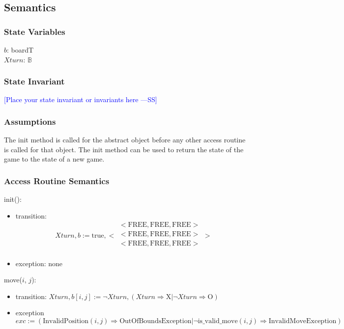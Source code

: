 \documentclass[12pt,fleqn]{examtst}
\newcommand{\authornote}[3]{\textcolor{#1}{[#3 ---#2]}}
\newcommand{\authornote}[3]{}
\newcommand{\wss}[1]{\authornote{blue}{SS}{#1}}
\begin{document}
\subsection* {Semantics}

\subsubsection* {State Variables}

$b$: boardT\\
$\mathit{Xturn}$: $\mathbb{B}$

\subsubsection* {State Invariant}

\wss{Place your state invariant or invariants here}\\

\subsubsection* {Assumptions}

The init method is called for the abstract object before any other access routine is called for that
object.  The init method can be used to return the state of the game to the state of a new game.

\subsubsection* {Access Routine Semantics}

init():
\begin{itemize}
\item transition: 
$$\mathit{Xturn}, b := \text{true}, 
< \begin{array}{c}
< \mbox{FREE}, \mbox{FREE}, \mbox{FREE} >\\
< \mbox{FREE}, \mbox{FREE}, \mbox{FREE} >\\
< \mbox{FREE}, \mbox{FREE}, \mbox{FREE} >\\
\end{array} >
$$
\item exception: none
\end{itemize}

\noindent move($i$, $j$):
\begin{itemize}
\item transition: $\mathit{Xturn}, b[i, j] := \neg \mathit{Xturn}, (\mathit{Xturn} \Rightarrow \mbox{X} | \neg
\mathit{Xturn} \Rightarrow \mbox{O})$
\item exception
$$exc := (\mbox{InvalidPosition}(i, j) \Rightarrow \mbox{OutOfBoundsException} | \neg \mbox{is\_valid\_move}(i, j)
\Rightarrow \mbox{InvalidMoveException})$$
\end{itemize}
\end{document}
